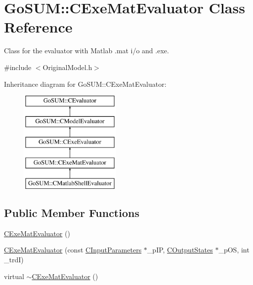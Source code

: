\hypertarget{class_go_s_u_m_1_1_c_exe_mat_evaluator}{\section{Go\-S\-U\-M\-:\-:C\-Exe\-Mat\-Evaluator Class Reference}
\label{class_go_s_u_m_1_1_c_exe_mat_evaluator}
}


Class for the evaluator with Matlab .mat i/o and .exe.  




{\ttfamily \#include $<$Original\-Model.\-h$>$}

Inheritance diagram for Go\-S\-U\-M\-:\-:C\-Exe\-Mat\-Evaluator\-:\begin{figure}[H]
\begin{center}
\leavevmode
\includegraphics[height=5.000000cm]{class_go_s_u_m_1_1_c_exe_mat_evaluator}
\end{center}
\end{figure}
\subsection*{Public Member Functions}
\begin{DoxyCompactItemize}
\item 
\hyperlink{class_go_s_u_m_1_1_c_exe_mat_evaluator_a567f837642d6c8cfe6797b9af99d7a8a}{C\-Exe\-Mat\-Evaluator} ()
\item 
\hyperlink{class_go_s_u_m_1_1_c_exe_mat_evaluator_a0accdf2e03193da831c6a6f1366d42e2}{C\-Exe\-Mat\-Evaluator} (const \hyperlink{class_go_s_u_m_1_1_c_input_parameters}{C\-Input\-Parameters} $\ast$\-\_\-p\-I\-P, \hyperlink{class_go_s_u_m_1_1_c_output_states}{C\-Output\-States} $\ast$\-\_\-p\-O\-S, int \-\_\-trd\-I)
\item 
virtual \hyperlink{class_go_s_u_m_1_1_c_exe_mat_evaluator_a734c6e6f58c93948045d5ff53fef8dc1}{$\sim$\-C\-Exe\-Mat\-Evaluator} ()
\end{DoxyCompactItemize}
